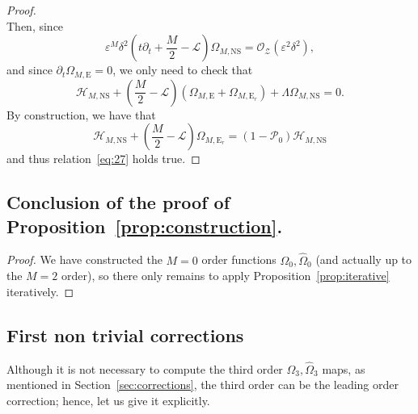 \documentclass[11pt,reqno,a4paper]{amsart}
\def\eps{\varepsilon}
\newcommand{\cH}{\mathcal{H}}
\newcommand{\cL}{\mathcal{L}}
\newcommand{\cO}{\mathcal{O}}
\newcommand{\cP}{\mathcal{P}}
\newcommand{\cZ}{\mathcal{Z}}
\newcommand{\1}{\mathbbm{1}}
\theoremstyle{definition}
\theoremstyle{definition}
\numberwithin{equation}{section}
\begin{document}
\begin{proof}
\begin{equation}
    \end{equation}
    Then, since $$\eps^{M}\delta^2 (t \partial_t + \frac{M}{2} - \cL) \Omega_{M,\mathrm{NS}} = \cO_\cZ(\eps^2 \delta^2),$$ and since $\partial_t \Omega_{M,\mathrm{E}} = 0$, we only need to check that
    \begin{equation}\label{eq:27}
        \cH_{M,\mathrm{NS}}  + \left(\frac{M}{2} - \cL\right) (\Omega_{M,\mathrm{E}}+\Omega_{M,\mathrm{E}_r}) + \Lambda\Omega_{M,\mathrm{NS}} = 0.
    \end{equation}
By construction, we have that
\begin{equation}
    \cH_{M,\mathrm{NS}} + \left(\frac{M}{2} - \cL\right)\Omega_{M,\mathrm{E}_r} = (1-\cP_0)\cH_{M,\mathrm{NS}}
\end{equation}
and thus relation~\cref{eq:27} holds true.
\end{proof}

\subsection*{Conclusion of the proof of Proposition~\ref{prop:construction}.} 
\begin{proof}
    We have constructed the $M=0$ order functions $\Omega_0,\widehat{\Omega}_0$ (and actually up to the $M=2$ order), so there only remains to apply Proposition~\ref{prop:iterative} iteratively.
\end{proof}

\subsection{First non trivial corrections}\label{sec:first_corrections}

Although it is not necessary to compute the third order $\Omega_3,\widehat{\Omega}_3$ maps, as mentioned in Section~\ref{sec:corrections}, the third order can be the leading order correction; hence, let us give it explicitly.
\end{document}
